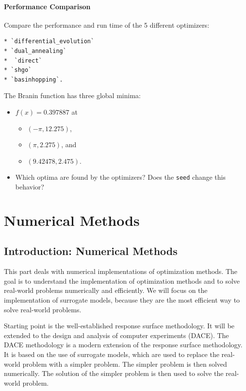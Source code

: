 \documentclass[
  letterpaper,
  DIV=11,
  numbers=noendperiod]{scrreprt}
\providecommand{\tightlist}{%
  \setlength{\itemsep}{0pt}\setlength{\parskip}{0pt}}\usepackage{longtable,booktabs,array}
\begin{document}
\hypertarget{performance-comparison}{%
\subsection{Performance Comparison}\label{performance-comparison}}

Compare the performance and run time of the 5 different optimizers:

\begin{verbatim}
* `differential_evolution`
* `dual_annealing`
*  `direct`
* `shgo`
* `basinhopping`.
\end{verbatim}

The Branin function has three global minima:

\begin{itemize}
\tightlist
\item
  \(f(x) = 0.397887\) at

  \begin{itemize}
  \tightlist
  \item
    \((-\pi, 12.275)\),
  \item
    \((\pi, 2.275)\), and
  \item
    \((9.42478, 2.475)\).\\
  \end{itemize}
\item
  Which optima are found by the optimizers? Does the \texttt{seed}
  change this behavior?
\end{itemize}

\part{Numerical Methods}

\hypertarget{introduction-numerical-methods}{%
\chapter{Introduction: Numerical
Methods}\label{introduction-numerical-methods}}

This part deals with numerical implementations of optimization methods.
The goal is to understand the implementation of optimization methods and
to solve real-world problems numerically and efficiently. We will focus
on the implementation of surrogate models, because they are the most
efficient way to solve real-world problems.

Starting point is the well-established response surface methodology. It
will be extended to the design and analysis of computer experiments
(DACE). The DACE methodology is a modern extension of the response
surface methodology. It is based on the use of surrogate models, which
are used to replace the real-world problem with a simpler problem. The
simpler problem is then solved numerically. The solution of the simpler
problem is then used to solve the real-world problem.
\end{document}

